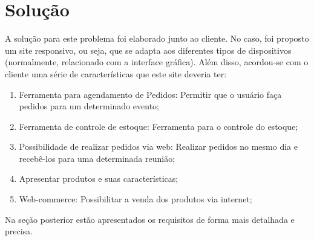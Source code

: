 {\large {\section { Solução \\ } } }

A solução para este problema foi elaborado junto ao cliente. No caso, foi proposto um site responsivo, ou seja, que se adapta aos diferentes tipos de dispositivos (normalmente, relacionado com a interface gráfica).  Além disso, acordou-se com o cliente uma série de características que este site deveria ter:

\begin{enumerate}
	\item Ferramenta para agendamento de Pedidos: Permitir que o usuário faça pedidos para um determinado evento;
	\item Ferramenta de controle de estoque: Ferramenta para o controle do estoque;
	\item Possibilidade de realizar pedidos via web: Realizar pedidos no mesmo dia e recebê-los para uma determinada reunião;
	\item Apresentar produtos e suas características;
	\item Web-commerce: Possibilitar a venda dos produtos  via internet;
\end{enumerate}

\tab Na seção posterior estão apresentados os requisitos de forma mais detalhada e precisa.


